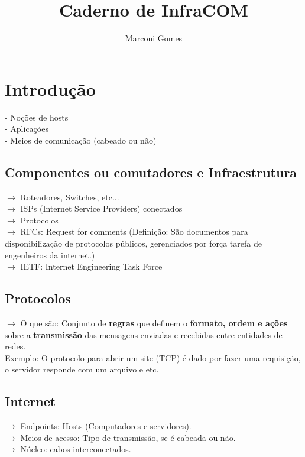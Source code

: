 \documentclass[12pt]{article}
\begin{document}
\nocite{*}

\title{Caderno de InfraCOM}
\author{Marconi Gomes}

\maketitle


\section{Introdução}
    - Noções de hosts
    \\- Aplicações
    \\- Meios de comunicação (cabeado ou não)
    
    \subsection{Componentes ou comutadores e Infraestrutura}
    $\rightarrow$ Roteadores, Switches, etc...
    \\$\rightarrow$ ISPs (Internet Service Providers) conectados
    \\$\rightarrow$ Protocolos
    \\$\rightarrow$ RFCs: Request for comments (Definição: São documentos para disponibilização de protocolos públicos, gerenciados por força tarefa de engenheiros da internet.)
    \\$\rightarrow$ IETF: Internet Engineering Task Force
    
    \subsection{Protocolos}
    $\rightarrow$ O que são: Conjunto de \textbf{regras} que definem o \textbf{formato, ordem e ações} sobre a \textbf{transmissão} das mensagens enviadas e recebidas entre entidades de redes. \quad \quad
    \\Exemplo: O protocolo para abrir um site (TCP) é dado por fazer uma requisição, o servidor responde com um arquivo e etc.

    \subsection{Internet}
    $\rightarrow$ Endpoints: Hosts (Computadores e servidores).
    \\$\rightarrow$ Meios de acesso: Tipo de transmissão, se é cabeada ou não.
    \\$\rightarrow$ Núcleo: cabos interconectados.
\end{document}
